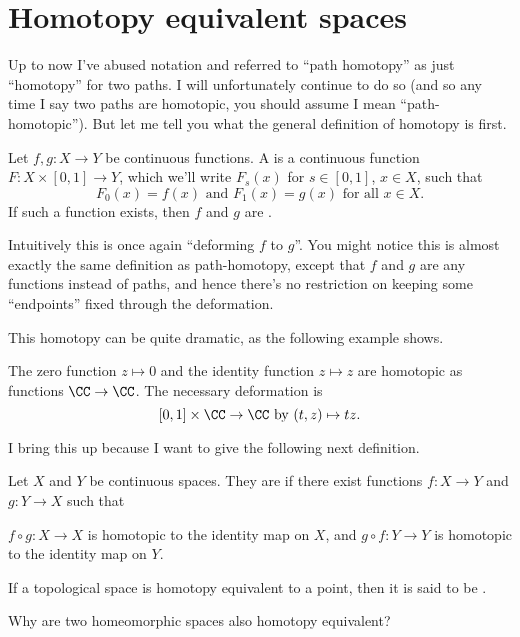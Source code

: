 \section{Homotopy equivalent spaces}
Up to now I've abused notation and referred to ``path homotopy'' as just ``homotopy'' for two paths.
I will unfortunately continue to do so (and so any time I say two paths are homotopic, you should assume I mean ``path-homotopic'').
But let me tell you what the general definition of homotopy is first.
\begin{definition}
	Let $f,g : X \to Y$ be continuous functions.
	A  is a continuous function $F : X \times [0,1] \to Y$,
	which we'll write $F_s(x)$ for $s \in [0,1]$, $x \in X$, such that 
	\[ F_0(x) = f(x) \text{ and } F_1(x) = g(x) \text{ for all $x \in X$.} \]
	If such a function exists, then $f$ and $g$ are .
\end{definition}
Intuitively this is once again ``deforming $f$ to $g$''.
You might notice this is almost exactly the same definition as path-homotopy,
except that $f$ and $g$ are any functions instead of paths, and hence
there's no restriction on keeping some ``endpoints'' fixed through the deformation.

This homotopy can be quite dramatic, as the following example shows.
\begin{example}
	The zero function $z \mapsto 0$ and the identity function $z \mapsto z$
	are homotopic as functions $\CC \to \CC$.
	The necessary deformation is
	\[ [0,1] \times \CC \to \CC \text{ by } (t,z) \mapsto tz. \]
\end{example}

I bring this up because I want to give the following next definition.
\begin{definition}
	Let $X$ and $Y$ be continuous spaces.
	They are  if there exist
	functions $f : X \to Y$ and $g : Y \to X$ such that
	\begin{enumerate}[(i)]
		\ii $f \circ g : X \to X$ is homotopic to the identity map on $X$, and
		\ii $g \circ f : Y \to Y$ is homotopic to the identity map on $Y$.
	\end{enumerate}
	If a topological space is homotopy equivalent to a point,
	then it is said to be .
\end{definition}
\begin{ques}
	Why are two homeomorphic spaces also homotopy equivalent?
\end{ques}

